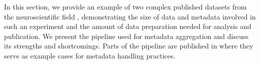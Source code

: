 In this section, we provide an example of two complex published datasets from the neuroscientific field \citep{Brochier_2018}, demonstrating the size of data and metadata involved in such an experiment and the amount of data preparation needed for analysis and publication. We present the pipeline used for metadata aggregation and discuss its strengths and shortcomings. Parts of the pipeline are published in \cite{Zehl_2016} where they serve as example cases for metadata handling practices.


% 
% 
% 
% 


% 
% 
% 
% 
% 



